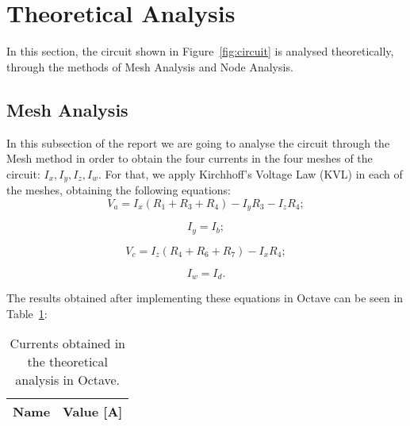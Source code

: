 \section{Theoretical Analysis}
\label{sec:analysis}

\tab In this section, the circuit shown in Figure~\ref{fig:circuit} is analysed
theoretically, through the methods of Mesh Analysis and Node Analysis.

\subsection{Mesh Analysis}
\label{subsec:mesh}
\tab In this subsection of the report we are going to analyse the circuit through the Mesh method in order to obtain the four currents in the four meshes of the circuit: $I_x, I_y, I_z, I_w$.
For that, we apply Kirchhoff's Voltage Law (KVL) in each of the meshes, obtaining the following equations: 
\begin{equation}
  V_a = I_x (R_1 + R_3 + R_4) - I_y R_3 - I_z R_4;
\end{equation}

\begin{equation}
  I_y = I_b;
\end{equation}

\begin{equation}
  V_c = I_z (R_4 + R_6 + R_7) - I_x R_4;
\end{equation}

\begin{equation}
  I_w = I_d.
\end{equation}

The results obtained after implementing these equations in Octave can be seen in Table~\ref{tab:octave_currents}:
\begin{table}[h]
  \centering
  \begin{tabular}{|l|r|}
    \hline    
    {\bf Name} & {\bf Value [A]} \\ \hline
	
  \end{tabular}
  \caption{Currents obtained in the theoretical analysis in Octave.}
  \label{tab:octave_currents}
\end{table}

